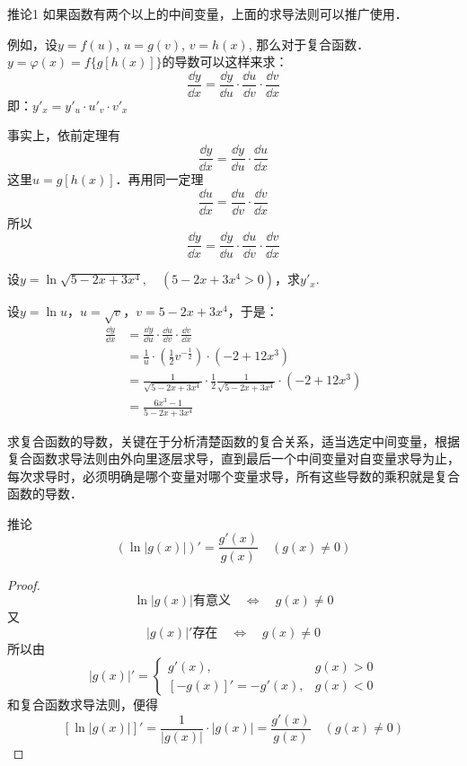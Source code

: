 \begin{blk}
{推论1} 如果函数有两个以上的中间变量，上面的求导法则可以推广使用．
\end{blk}

例如，设$y=f(u)$, $u=g(v)$, $v=h(x)$, 那么对于复合函数．$y=\varphi (x)=f\{g[h(x)]\}$的导数可以这样来求：
\[\frac{\dd y}{\dd x}=\frac{\dd y}{\dd u}\cdot \frac{\dd u}{\dd v}\cdot \frac{\dd v}{\dd x}\]
即：$y'_x=y'_u\cdot u'_v\cdot v'_x$

事实上，依前定理有
\[\frac{\dd y}{\dd x}=\frac{\dd y}{\dd u}\cdot \frac{\dd u}{\dd x}\]
这里$u=g[h(x)]$．再用同一定理
\[\frac{\dd u}{\dd x}=\frac{\dd u}{\dd v}\cdot \frac{\dd v}{\dd x}\]
所以
\[\frac{\dd y}{\dd x}=\frac{\dd y}{\dd u}\cdot \frac{\dd u}{\dd v}\cdot \frac{\dd v}{\dd x}\]


\begin{example}
    设$y=\ln\sqrt{5-2x+3x^4},\quad (5-2x+3x^4>0)$，求$y'_x$.
\end{example}

    
\begin{solution}
    设$y=\ln u$，$u=\sqrt{v}$，$v=5-2x+3x^4$，于是：
\begin{align*}
    \frac{\dd y}{\dd x}&=\frac{\dd y}{\dd u}\cdot \frac{\dd u}{\dd v}\cdot \frac{\dd v}{\dd x}\\
    &=\frac{1}{u}\cdot \left(\frac{1}{2}v^{-\tfrac{1}{2}}\right)\cdot (-2+12x^3)\\
    &=\frac{1}{\sqrt{5-2x+3x^4}}\cdot \frac{1}{2}\frac{1}{\sqrt{5-2x+3x^4}}\cdot (-2+12x^3)\\
    &=\frac{6x^3-1}{5-2x+3x^4}
\end{align*}
\end{solution}

求复合函数的导数，关键在于分析清楚函数的复合关系，适当选定中间变量，根据复合函数求导法则由外向里逐层求导，直到最后一个中间变量对自变量求导为止，每次求导时，必须明确是哪个变量对哪个变量求导，所有这些导数的乘积就是复合函数的导数．

\begin{blk}{推论}
    \[(\ln|g(x)|)'=\frac{g'(x)}{g(x)}\quad (g(x)\ne 0)\]
\end{blk}

\begin{proof}
  \[\ln|g(x)|\text{有意义}\quad \Longleftrightarrow\quad g(x)\ne 0\]  
又
\[|g(x)|'\text{存在}\quad \Longleftrightarrow\quad g(x)\ne 0\]
所以由
\[|g(x)|'=\begin{cases}
    g'(x) ,  & g(x)>0\\
    [-g(x)]'=-g'(x), & g(x)<0
\end{cases}\]
和复合函数求导法则，便得
\[[\ln|g(x)|]'=\frac{1}{|g(x)|}\cdot |g(x)|=\frac{g'(x)}{g(x)}\quad (g(x)\ne 0)\]
\end{proof}

